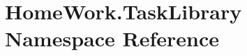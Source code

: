 \hypertarget{namespace_home_work_1_1_task_library}{}\section{Home\+Work.\+Task\+Library Namespace Reference}
\label{namespace_home_work_1_1_task_library}
